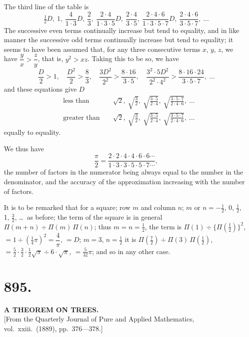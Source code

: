\documentclass[11pt,a4paper]{book}
\begin{document}
The third line of the table is
\[
\tfrac{1}{2}D,\ 1,\ \frac{4}{1 \cdot 3}D,\ \frac{2}{3},\ \frac{2 \cdot 4}{1 \cdot 3 \cdot 5}D,\ \frac{2 \cdot 4}{3 \cdot 5},\ \frac{2 \cdot 4 \cdot 6}{1 \cdot 3 \cdot 5 \cdot 7}D,\ \frac{2 \cdot 4 \cdot 6}{3 \cdot 5 \cdot 7},\ \ldots
\]
The successive even terms continually increase but tend to equality, and in like manner the successive odd terms continually increase but tend to equality; it seems to have been assumed that, for any three consecutive terms $x$, $y$, $z$, we have $\dfrac{y}{x} > \dfrac{z}{y}$, that is, $y^2 > xz$. Taking this to be so, we have
\[
\frac{D}{2} > 1,\quad \frac{D^2}{2} > \frac{8}{3},\quad \frac{3D^2}{2^2} > \frac{8 \cdot 16}{3 \cdot 5},\quad \frac{3^2 \cdot 5 D^2}{2^2 \cdot 4^2} > \frac{8 \cdot 16 \cdot 24}{3 \cdot 5 \cdot 7},\ \ldots
\]
and these equations give $D$
\begin{align*}
&\text{less than } && \sqrt{2},\ \sqrt{\frac{3}{2}},\ \sqrt{\frac{3 \cdot 5}{2 \cdot 4}},\ \sqrt{\frac{3 \cdot 5 \cdot 7}{2 \cdot 4 \cdot 6}},\ \ldots \\
&\text{greater than } && \sqrt{2},\ \sqrt{\frac{3}{2}},\ \sqrt{\frac{3 \cdot 5}{2 \cdot 4}},\ \sqrt{\frac{3 \cdot 5 \cdot 7}{2 \cdot 4 \cdot 6}},\ \ldots
\end{align*}
equally to equality.

We thus have
\[
\frac{\pi}{2} = \frac{2 \cdot 2 \cdot 4 \cdot 4 \cdot 6 \cdot 6 \cdots}{1 \cdot 3 \cdot 3 \cdot 5 \cdot 5 \cdot 7 \cdots},
\]
the number of factors in the numerator being always equal to the number in the denominator, and the accuracy of the approximation increasing with the number of factors.

It is to be remarked that for a square; row $m$ and column $n$; $m$ or $n = -\tfrac{1}{2}$, 0, $\tfrac{1}{2}$, 1, $\tfrac{3}{2}$, \ldots\ as before; the term of the square is in general $\Pi(m+n) \div \Pi(m)\,\Pi(n)$; thus $m = n = \tfrac{1}{2}$, the term is $\Pi(1) \div \{\Pi(\tfrac{1}{2})\}^2$, $= 1 \div (\tfrac{1}{4}\pi)^2 = \dfrac{4}{\pi}$, $= D$; $m = 3$, $n = \tfrac{1}{2}$ it is $\Pi(\tfrac{7}{2}) \div \Pi(3)\,\Pi(\tfrac{1}{2})$, $= \tfrac{5}{2} \cdot \tfrac{3}{2} \cdot \tfrac{1}{2}\sqrt{\pi} \div 6 \cdot \sqrt{\pi}$, $= \tfrac{5}{32}\pi$; and so in any other case.


\section*{895.}
\begin{center}
{\large\bfseries A THEOREM ON TREES.}\\[0.5em]
\small [From the Quarterly Journal of Pure and Applied Mathematics, vol.\ xxiii.\ (1889), pp.\ 376---378.]
\end{center}
\end{document}
